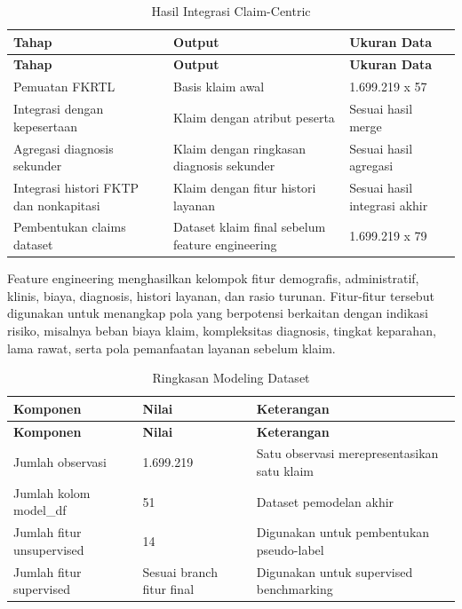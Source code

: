 \begin{longtable}[]{@{}p{}p{}p{}@{}}
\caption{Hasil Integrasi Claim-Centric}\label{tab:hasil-integrasi-claim-centric}\\
\toprule
\textbf{Tahap} & \textbf{Output} & \textbf{Ukuran Data} \\
\midrule
\endfirsthead
\toprule
\textbf{Tahap} & \textbf{Output} & \textbf{Ukuran Data} \\
\midrule
\endhead
\bottomrule
\endfoot
Pemuatan FKRTL & Basis klaim awal & 1.699.219 x 57 \\
Integrasi dengan kepesertaan & Klaim dengan atribut peserta & Sesuai hasil merge \\
Agregasi diagnosis sekunder & Klaim dengan ringkasan diagnosis sekunder & Sesuai hasil agregasi \\
Integrasi histori FKTP dan nonkapitasi & Klaim dengan fitur histori layanan & Sesuai hasil integrasi akhir \\
Pembentukan claims dataset & Dataset klaim final sebelum feature engineering & 1.699.219 x 79 \\
\end{longtable}

Feature engineering menghasilkan kelompok fitur demografis, administratif, klinis, biaya, diagnosis, histori layanan, dan rasio turunan. Fitur-fitur tersebut digunakan untuk menangkap pola yang berpotensi berkaitan dengan indikasi risiko, misalnya beban biaya klaim, kompleksitas diagnosis, tingkat keparahan, lama rawat, serta pola pemanfaatan layanan sebelum klaim.

\begin{longtable}[]{@{}p{}p{}p{}@{}}
\caption{Ringkasan Modeling Dataset}\label{tab:ringkasan-modeling-dataset}\\
\toprule
\textbf{Komponen} & \textbf{Nilai} & \textbf{Keterangan} \\
\midrule
\endfirsthead
\toprule
\textbf{Komponen} & \textbf{Nilai} & \textbf{Keterangan} \\
\midrule
\endhead
\bottomrule
\endfoot
Jumlah observasi & 1.699.219 & Satu observasi merepresentasikan satu klaim \\
Jumlah kolom model\_df & 51 & Dataset pemodelan akhir \\
Jumlah fitur unsupervised & 14 & Digunakan untuk pembentukan pseudo-label \\
Jumlah fitur supervised & Sesuai branch fitur final & Digunakan untuk supervised benchmarking \\
\end{longtable}

